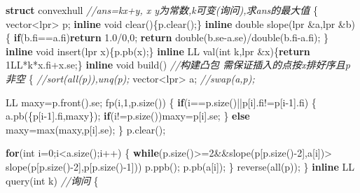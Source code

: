 \documentclass[
]{article}
\newenvironment{Shaded}{}{}
\newcommand{\BuiltInTok}[1]{#1}
\newcommand{\CommentTok}[1]{\textcolor[rgb]{0.38,0.63,0.69}{\textit{#1}}}
\newcommand{\ControlFlowTok}[1]{\textcolor[rgb]{0.00,0.44,0.13}{\textbf{#1}}}
\newcommand{\DataTypeTok}[1]{\textcolor[rgb]{0.56,0.13,0.00}{#1}}
\newcommand{\DecValTok}[1]{\textcolor[rgb]{0.25,0.63,0.44}{#1}}
\newcommand{\FloatTok}[1]{\textcolor[rgb]{0.25,0.63,0.44}{#1}}
\newcommand{\KeywordTok}[1]{\textcolor[rgb]{0.00,0.44,0.13}{\textbf{#1}}}
\newcommand{\NormalTok}[1]{#1}
\begin{document}
\begin{Shaded}
\begin{Highlighting}[]
\KeywordTok{struct}\NormalTok{ convexhull }\CommentTok{//ans=kx+y, x y为常数,k可变(询问),求ans的最大值 }
\NormalTok{\{}
\NormalTok{    vector\textless{}lpr\textgreater{} p;}
    \KeywordTok{inline} \DataTypeTok{void}\NormalTok{ clear()\{p.clear();\}}
    \KeywordTok{inline} \DataTypeTok{double}\NormalTok{ slope(lpr \&a,lpr \&b)}
\NormalTok{    \{}
        \ControlFlowTok{if}\NormalTok{(b.fi==a.fi)}\ControlFlowTok{return} \FloatTok{1.0}\NormalTok{/}\DecValTok{0}\NormalTok{,}\DecValTok{0}\NormalTok{;}
        \ControlFlowTok{return} \DataTypeTok{double}\NormalTok{(b.se{-}a.se)/}\DataTypeTok{double}\NormalTok{(b.fi{-}a.fi);}
\NormalTok{    \}}
    \KeywordTok{inline} \DataTypeTok{void}\NormalTok{ insert(lpr x)\{p.pb(x);\}}
    \KeywordTok{inline}\NormalTok{ LL val(}\DataTypeTok{int}\NormalTok{ k,lpr \&x)\{}\ControlFlowTok{return} \DecValTok{1}\BuiltInTok{LL}\NormalTok{*k*x.fi+x.se;\}}
    \KeywordTok{inline} \DataTypeTok{void}\NormalTok{ build() }\CommentTok{//构建凸包 需保证插入的点按x排好序且p非空}
\NormalTok{    \{}
        \CommentTok{//sort(all(p)),unq(p); }
\NormalTok{        vector\textless{}lpr\textgreater{} a; }\CommentTok{//swap(a,p);}

\NormalTok{        LL maxy=p.front().se;}
\NormalTok{        fp(i,}\DecValTok{1}\NormalTok{,p.size())}
\NormalTok{        \{}
            \ControlFlowTok{if}\NormalTok{(i==p.size()||p[i].fi!=p[i{-}}\DecValTok{1}\NormalTok{].fi)}
\NormalTok{            \{}
\NormalTok{                a.pb(\{p[i{-}}\DecValTok{1}\NormalTok{].fi,maxy\});}
                \ControlFlowTok{if}\NormalTok{(i!=p.size())maxy=p[i].se;}
\NormalTok{            \}}
            \ControlFlowTok{else}\NormalTok{ maxy=max(maxy,p[i].se);}
\NormalTok{        \}}
\NormalTok{        p.clear();}

        \ControlFlowTok{for}\NormalTok{(}\DataTypeTok{int}\NormalTok{ i=}\DecValTok{0}\NormalTok{;i\textless{}a.size();i++)}
\NormalTok{        \{}
            \ControlFlowTok{while}\NormalTok{(p.size()\textgreater{}=}\DecValTok{2}\NormalTok{\&\&slope(p[p.size(){-}}\DecValTok{2}\NormalTok{],a[i])\textgreater{}}
\NormalTok{                slope(p[p.size(){-}}\DecValTok{2}\NormalTok{],p[p.size(){-}}\DecValTok{1}\NormalTok{]))}
\NormalTok{                    p.ppb();}
\NormalTok{            p.pb(a[i]);}
\NormalTok{        \}}
\NormalTok{        reverse(all(p));}
\NormalTok{    \}}
    \KeywordTok{inline}\NormalTok{ LL query(}\DataTypeTok{int}\NormalTok{ k) }\CommentTok{//询问}
\NormalTok{    \{}
        

\end{Highlighting}
\end{Shaded}
\end{document}
